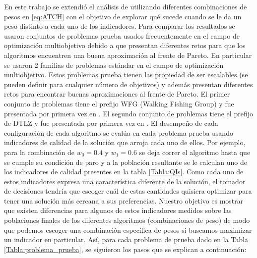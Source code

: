 En este trabajo se extendió el análisis de \cite{PFI} utilizando diferentes combinaciones de pesos en \eqref{eq:ATCH} con el objetivo de explorar qué sucede cuando se le da un peso distinto a cada uno de los indicadores. Para comparar los resultados se usaron conjuntos de problemas prueba usados frecuentemente en el campo de optimización multiobjetivo debido a que presentan diferentes retos para que los algoritmos encuentren una buena aproximación al frente de Pareto. En particular se usaron 2 familias de problemas estándar en el campo de optimización multiobjetivo. Estos problemas prueba tienen las propiedad de ser escalables (se pueden definir para cualquier número de objetivos) y además presentan diferentes retos para encontrar buenas aproximaciones al frente de Pareto. El primer conjunto de problemas tiene el prefijo WFG (Walking Fishing Group) y fue presentada por primera vez en \cite{hubandScalableMultiobjectiveTest2005}. El segundo conjunto de problemas  tiene el prefijo de DTLZ y  fue presentada por primera vez en \cite{debScalableMultiobjectiveOptimization2002}. El desempeño de cada configuración de cada algoritmo se evalúa en cada problema prueba usando indicadores de calidad de la solución que arroja cada uno de ellos. Por ejemplo, para la combinación de $w_0=0.4$ y $w_1=0.6$ se deja correr el algoritmo hasta que se cumple su condición de paro y a la población resultante se le calculan uno de los indicadores de calidad presentes en la tabla \ref{Tabla:QIs}. Como cada uno de estos indicadores expresa una característica diferente de la solución, el tomador de decisiones tendría que escoger cuál de estas cantidades quisiera optimizar para tener una solución más cercana a sus preferencias. Nuestro objetivo es mostrar que existen diferencias para algunos de estos indicadores medidos sobre las poblaciones finales de los diferentes algoritmos (combinaciones de peso) de modo que podemos escoger una combinación específica de pesos si buscamos maximizar un indicador en particular.  
Así, para cada problema de prueba dado en la Tabla \ref{Tabla:problema_prueba}, se siguieron los pasos que se explican a continuación:

